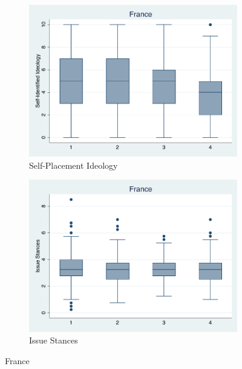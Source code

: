 \documentclass[12pt, titlepage]{article}
\begin{document}
\begin{figure}[H]
	\centering
	\begin{subfigure}[b]{0.475\textwidth}   
		\centering 
		\includegraphics[width=\textwidth]{IdeoBP/France}
		\caption{Self-Placement Ideology}
	\end{subfigure}
	\hfill
	\begin{subfigure}[b]{0.475\textwidth}
		\centering 
		\includegraphics[width=\textwidth]{BoxLib/France}
		\caption{Issue Stances}
	\end{subfigure}
	\caption{France}
	\label{France}
\end{figure}
\end{document}
